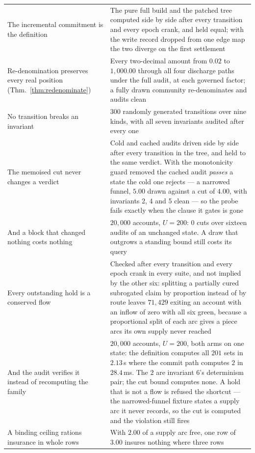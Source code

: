 \begin{longtable}{@{}p{}p{}@{}}
The incremental commitment is the definition
  & The pure full build and the patched tree computed side by side after every transition
    and every epoch crank, and held equal; with the write record dropped from one edge
    map the two diverge on the first settlement \\
Re-denomination preserves every real position (Thm.~\ref{thm:redenominate})
  & Every two-decimal amount from $0.02$ to $1{,}000.00$ through all four discharge paths
    under the full audit, at each governed factor; a fully drawn community re-denominates
    and audits clean \\
No transition breaks an invariant
  & $300$ randomly generated transitions over nine kinds, with all seven invariants audited
    after every one \\
The memoised cut never changes a verdict
  & Cold and cached audits driven side by side after every transition in the tree, and
    held to the same verdict. With the monotonicity guard removed the cached audit
    \emph{passes} a state the cold one rejects --- a narrowed funnel, $5.00$ drawn
    against a cut of $4.00$, with invariants 2, 4 and 5 clean --- so the probe fails
    exactly when the clause it gates is gone \\
And a block that changed nothing costs nothing
  & $20{,}000$ accounts, $U = 200$: \textbf{$0$} cuts over sixteen audits of an unchanged
    state. A draw that outgrows a standing bound still costs its query \\
Every outstanding hold is a conserved flow
  & Checked after every transition and every epoch crank in every suite, and not implied
    by the other six: splitting a partially cured subrogated claim by proportion instead
    of by route leaves $71{,}429$ exiting an account with an inflow of zero with all six
    green, because a proportional split of each arc gives a piece arcs its own supply never
    reached \\
And the audit verifies it instead of recomputing the family
  & $20{,}000$ accounts, $U = 200$, both arms on one state: the definition computes all
    $201$ sets in $2.13$\,s where the commit path computes $2$ in $28.4$\,ms. The $2$ are
    invariant 6's determinism pair; the cut bound computes none. A hold that is not a flow
    is refused the shortcut --- the narrowed-funnel fixture states a supply arc it never
    records, so the cut is computed and the violation still fires \\
A binding ceiling rations insurance in whole rows
  & With $2.00$ of a supply arc free, one row of $3.00$ insures nothing where three rows

\end{longtable}
